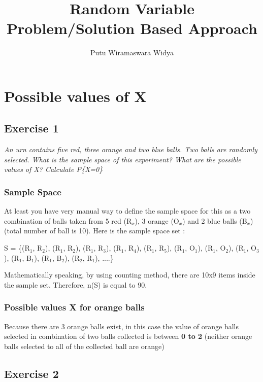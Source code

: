 \documentclass[12pt,a4paper]{article}
\begin{document}
\title {Random Variable\\ Problem/Solution Based Approach}
\author {Putu Wiramaswara Widya}
	
\maketitle

\section{Possible values of X}

\subsection{Exercise 1}
\textit{An urn contains five red, three orange and two blue balls. Two balls are randomly selected. What is the sample space of this experiment? What are the possible values of X? Calculate P\{X=0\}}

\subsubsection{Sample Space}

At least you have very manual way to define the sample space for this as a two combination of balls taken from 5 red (R$_x$), 3 orange  (O$_x$) and 2 blue balls  (B$_x$) (total number of ball is 10). Here is the sample space set :

S = \{(R$_1$, R$_2$), 
(R$_1$, R$_2$),
(R$_1$, R$_3$),
(R$_1$, R$_4$),
(R$_1$, R$_5$),
(R$_1$, O$_1$),
(R$_1$, O$_2$),
(R$_1$, O$_3$),
(R$_1$, B$_1$),
(R$_1$, B$_2$),
(R$_2$, R$_1$),
....\}

Mathematically speaking, by using counting method, there are 10x9 items inside the sample set. Therefore, n(S) is equal to 90.

\subsubsection{Possible values X for orange balls}

Because there are 3 orange balls exist, in this case the value of orange balls selected in combination of two balls collected is between \textbf{0 to 2} (neither orange balls selected to all of the collected ball are orange)

\subsection{Exercise 2}
\end{document}
